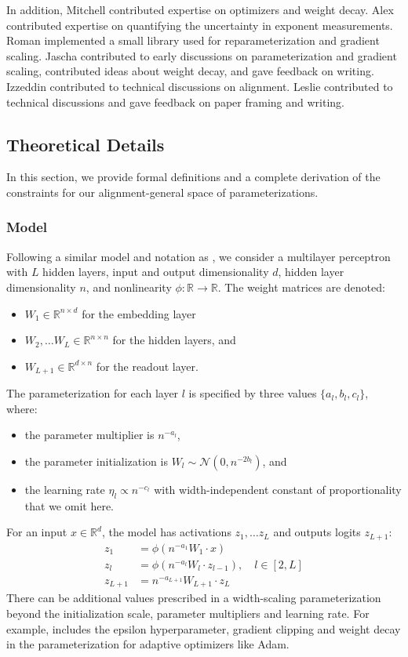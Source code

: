 \documentclass{article}
\theoremstyle{plain}
\theoremstyle{definition}
\theoremstyle{remark}
\newcommand{\R}{\mathbb{R}}
\begin{document}
In addition, Mitchell contributed expertise on optimizers and weight decay. Alex contributed expertise on quantifying the uncertainty in exponent measurements. Roman implemented a small library used for reparameterization and gradient scaling. Jascha contributed to early discussions on parameterization and gradient scaling, contributed ideas about weight decay, and gave feedback on writing. Izzeddin contributed to technical discussions on alignment. Leslie contributed to technical discussions and gave feedback on paper framing and writing.

\subsection{Theoretical Details}
\label{app:theory}
In this section, we provide formal definitions and a complete derivation of the constraints for our alignment-general space of parameterizations.

\subsubsection{Model}
\label{app:theory_model}
Following a similar model and notation as \citet{yang2021tensoriv}, we consider a multilayer perceptron with $L$ hidden layers, input and output dimensionality $d$, hidden layer dimensionality $n$, and nonlinearity $\phi: \R \rightarrow \R$. The weight matrices are denoted:
\begin{itemize}
    \item $W_1 \in \R^{n \times d}$ for the embedding layer
    \item $W_2, \ldots W_L \in \R ^ {n \times n}$ for the hidden layers, and
    \item $W_{L+1} \in \R^{d \times n}$ for the readout layer.
\end{itemize}

The parameterization for each layer $l$ is specified by three values $\{a_l, b_l, c_l\}$, where:
\begin{itemize}
    \item the parameter multiplier is $n^{-a_l}$,
    \item the parameter initialization is $W_l \sim \mathcal{N}(0, n^{-2b_l})$, and
    \item  the learning rate $\eta_l \propto n^{-c_l}$ with width-independent constant of proportionality that we omit here.
\end{itemize}

For an input $x \in \R^d$, the model has activations $z_1, \ldots z_L$ and outputs logits $z_{L+1}$:
\begingroup
\begin{align*}
    z_1 &= \phi(n^{-a_1} W_1 \cdot x)\\
    z_l &= \phi(n^{-a_l} W_l \cdot z_{l-1}), \quad l \in [2, L]\\
    z_{L+1} &= n^{-a_{L+1}} W_{L+1} \cdot z_L
\end{align*}
\endgroup
There can be additional values prescribed in a width-scaling parameterization beyond the initialization scale, parameter multipliers and learning rate. For example, \citet{yang2023tensorivb} includes the epsilon hyperparameter, gradient clipping and weight decay in the parameterization for adaptive optimizers like Adam.
\end{document}
